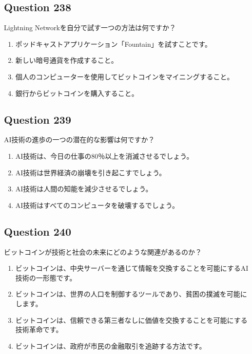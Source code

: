 \documentclass[12pt,a4paper]{article}
\begin{document}
\bigskip


\subsection*{Question 238}
Lightning Networkを自分で試す一つの方法は何ですか？

\begin{enumerate}[label=\Alph*., leftmargin=*]
\item ポッドキャストアプリケーション「Fountain」を試すことです。
\item 新しい暗号通貨を作成すること。
\item 個人のコンピューターを使用してビットコインをマイニングすること。
\item 銀行からビットコインを購入すること。
\end{enumerate}

\bigskip


\subsection*{Question 239}
AI技術の進歩の一つの潜在的な影響は何ですか？

\begin{enumerate}[label=\Alph*., leftmargin=*]
\item AI技術は、今日の仕事の80％以上を消滅させるでしょう。
\item AI技術は世界経済の崩壊を引き起こすでしょう。
\item AI技術は人間の知能を減少させるでしょう。
\item AI技術はすべてのコンピュータを破壊するでしょう。
\end{enumerate}

\bigskip


\subsection*{Question 240}
ビットコインが技術と社会の未来にどのような関連があるのか？

\begin{enumerate}[label=\Alph*., leftmargin=*]
\item ビットコインは、中央サーバーを通じて情報を交換することを可能にするAI技術の一形態です。
\item ビットコインは、世界の人口を制御するツールであり、貧困の撲滅を可能にします。
\item ビットコインは、信頼できる第三者なしに価値を交換することを可能にする技術革命です。
\item ビットコインは、政府が市民の金融取引を追跡する方法です。
\end{enumerate}
\end{document}
